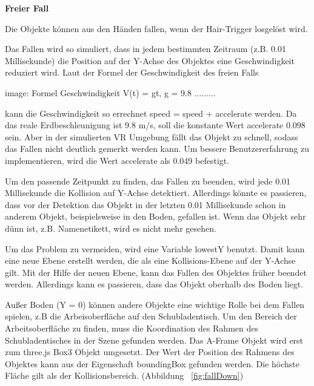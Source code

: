   \vspace{1em}
  \noindent
  \textbf{Freier Fall}
  \vspace{1em}
  
  \noindent
  Die Objekte können aus den Händen fallen, wenn der Hair-Trigger losgelöst wird.
  
  Das Fallen wird so simuliert, dass in jedem bestimmten Zeitraum (z.B. 0.01 Millisekunde) die Position auf der Y-Achse des Objektes eine Geschwindigkeit reduziert wird. Laut der Formel der Geschwindigkeit des freien Falls 
  
  image: Formel Geschwindigkeit V(t) = gt, g = 9.8 .........
  
  kann die Geschwindigkeit so errechnet {\selectfont speed = speed + accelerate} werden. 
  Da das reale Erdbeschleunigung ist 9.8 m/s, soll die konstante Wert {\selectfont accelerate} 0.098 sein. Aber in der simulierten VR Umgebung fällt das Objekt zu schnell, sodass das Fallen nicht deutlich gemerkt werden kann. Um bessere Benutzererfahrung zu implementieren, wird die Wert {\selectfont accelerate} als 0.049 befestigt.
  
  Um den passende Zeitpunkt zu finden, das Fallen zu beenden, wird jede 0.01 Millisekunde die Kollision auf Y-Achse detektiert. Allerdings könnte es passieren, dass vor der Detektion das Objekt in der letzten 0.01 Millisekunde schon in anderem Objekt, beispielsweise in den Boden, gefallen ist. Wenn das Objekt sehr dünn ist, z.B. Namenetikett, wird es nicht mehr gesehen.
  
  Um das Problem zu vermeiden, wird eine Variable {\selectfont lowestY} benutzt. Damit kann eine neue Ebene erstellt werden, die als eine Kollisions-Ebene auf der Y-Achse gilt. Mit der Hilfe der neuen Ebene, kann das Fallen des Objektes früher beendet werden. Allerdings kann es passieren, dass das Objekt oberhalb des Boden liegt.
  
  Außer Boden (Y = 0) können andere Objekte eine wichtige Rolle bei dem Fallen spielen, z.B die Arbeisoberfläche auf den Schubladentisch. Um den Bereich der Arbeitsoberfläche zu finden, muss die Koordination des Rahmen des Schubladentisches in der Szene gefunden werden. Das A-Frame Objekt wird erst zum three.js Box3 Objekt umgesetzt. Der Wert der Position des Rahmens des Objektes kann aus der Eigenschaft {\selectfont boundingBox} gefunden werden. Die höchste Fläche gilt als der Kollisionsbereich. (Abbildung ~\ref{fig:fallDown})
  
